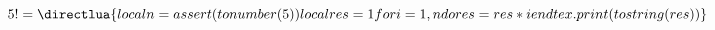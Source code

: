 \documentclass{article}
\newcommand{\fattoriale}[1]{\directlua{
    local n = assert(tonumber(#1))
    local res = 1
    for i = 1, n do
        res = res * i
    end
    tex.print(tostring(res))
}}
\begin{document}
\( 5! = \fattoriale{5} \)
\end{document}
